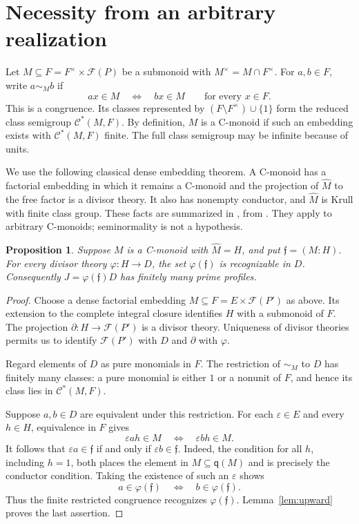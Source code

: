 \documentclass[11pt]{article}
\newtheorem{proposition}[theorem]{Proposition}
\theoremstyle{definition}
\newcommand{\q}{\mathsf q}
\newcommand{\F}{\mathcal F}
\newcommand{\C}{\mathcal C}
\newcommand{\ff}{\mathfrak f}
\begin{document}
\section{Necessity from an arbitrary realization}

Let $M\subseteq F=F^\times\times\F(P)$ be a submonoid with $M^\times=M\cap F^\times$. For $a,b\in F$, write $a\sim_M b$ if
\[
 ax\in M\quad\Longleftrightarrow\quad bx\in M\qquad\text{for every }x\in F.
\]
This is a congruence. Its classes represented by $(F\setminus F^\times)\cup\{1\}$ form the reduced class semigroup $\C^*(M,F)$. By definition, $M$ is a C-monoid if such an embedding exists with $\C^*(M,F)$ finite. The full class semigroup may be infinite because of units.

We use the following classical dense embedding theorem. A C-monoid has a factorial embedding in which it remains a C-monoid and the projection of $\widehat M$ to the free factor is a divisor theory. It also has nonempty conductor, and $\widehat M$ is Krull with finite class group. These facts are summarized in \cite[Section 2, equation (2.4)]{GZ}, from \cite[Theorems 2.9.11--2.9.12]{GHK}. They apply to arbitrary C-monoids; seminormality is not a hypothesis.

\begin{proposition}\label{prop:necessary}
Suppose $M$ is a C-monoid with $\widehat M=H$, and put $\ff=(M:H)$. For every divisor theory $\varphi:H\to D$, the set $\varphi(\ff)$ is recognizable in $D$. Consequently $J=\varphi(\ff)D$ has finitely many prime profiles.
\end{proposition}
\begin{proof}
Choose a dense factorial embedding $M\subseteq F=E\times\F(P')$ as above. Its extension to the complete integral closure identifies $H$ with a submonoid of $F$. The projection $\partial:H\to\F(P')$ is a divisor theory. Uniqueness of divisor theories permits us to identify $\F(P')$ with $D$ and $\partial$ with $\varphi$.

Regard elements of $D$ as pure monomials in $F$. The restriction of $\sim_M$ to $D$ has finitely many classes: a pure monomial is either $1$ or a nonunit of $F$, and hence its class lies in $\C^*(M,F)$.

Suppose $a,b\in D$ are equivalent under this restriction. For each $\varepsilon\in E$ and every $h\in H$, equivalence in $F$ gives
\[
 \varepsilon ah\in M\quad\Longleftrightarrow\quad\varepsilon bh\in M.
\]
It follows that $\varepsilon a\in\ff$ if and only if $\varepsilon b\in\ff$. Indeed, the condition for all $h$, including $h=1$, both places the element in $M\subseteq\q(M)$ and is precisely the conductor condition. Taking the existence of such an $\varepsilon$ shows
\[
 a\in\varphi(\ff)\quad\Longleftrightarrow\quad b\in\varphi(\ff).
\]
Thus the finite restricted congruence recognizes $\varphi(\ff)$. Lemma~\ref{lem:upward} proves the last assertion.
\end{proof}
\end{document}

